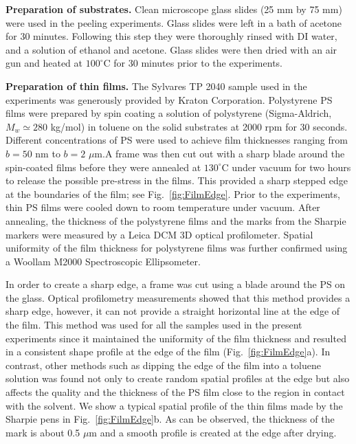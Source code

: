 \documentclass[10pt,twocolumn]{article}
\begin{document}
{\bf{Preparation of substrates.}} Clean microscope glass slides (25 mm by 75 mm) were used in the peeling experiments.
Glass slides were left in a bath of acetone for 30 minutes.
Following this step they were thoroughly rinsed with DI water, and a solution of ethanol and acetone.
Glass slides were then dried with an air gun and heated at $100^{\circ}$C for 30 minutes prior to the experiments.


{\bf{Preparation of thin films.}} The Sylvares\textsuperscript{\textregistered} TP 2040 sample used in the experiments was generously provided by Kraton Corporation.
Polystyrene PS films were prepared by spin coating a solution of polystyrene (Sigma-Aldrich, $M_w \simeq 280$ kg/mol) in toluene on the solid substrates at 2000 rpm for 30 seconds.
Different concentrations of PS were used to achieve film thicknesses ranging from $b = 50$ nm to $b = 2$ $\mu$m.A frame was then cut out with a sharp blade around the spin-coated films before they were annealed at $130^{\circ}$C under vacuum for two hours to release the possible pre-stress in the films.
This provided a sharp stepped edge at the boundaries of the film; see Fig.~\ref{fig:FilmEdge}.
Prior to the experiments, thin PS films were cooled down to room temperature under vacuum.
After annealing, the thickness of the polystyrene films and the marks from the Sharpie\textsuperscript{\textregistered} markers were measured by a Leica DCM 3D optical profilometer.
Spatial uniformity of the film thickness for polystyrene films was further confirmed using a Woollam M2000 Spectroscopic Ellipsometer.

In order to create a sharp edge, a frame was cut using a blade around the PS on the glass.
Optical profilometry measurements showed that this method provides a sharp edge, however, it can not provide a straight horizontal line at the edge of the film.
This method was used for all the samples used in the present experiments since it maintained the uniformity of the film thickness and resulted in a consistent shape profile at the edge of the film (Fig.~\ref{fig:FilmEdge}a).
In contrast, other methods such as dipping the edge of the film into a toluene solution was found not only to create random spatial profiles at the edge but also affects the quality and the thickness of the PS film close to the region in contact with the solvent.
We show a typical spatial profile of the thin films made by the Sharpie\textsuperscript{\textregistered} pens in Fig.~\ref{fig:FilmEdge}b.
As can be observed, the thickness of the mark is about 0.5 $\mu$m and a smooth profile is created at the edge after drying.
\end{document}

